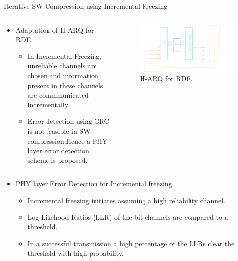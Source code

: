 \documentclass[final,hyperref={pdfpagelabels=false}]{beamer}
\begin{document}
\begin{frame}[t]
\begin{columns}[t]
\begin{column}{.465\textwidth}
\begin{block}{Iterative SW Compression using Incremental Freezing }
\begin{columns} %
\begin{column}{.5\textwidth}
\begin{itemize}
\item Adaptation of H-ARQ for RDE.
\begin{itemize}
\item In Incremental Freezing, unreliable channels are chosen and information present in these channels are commmunicated \cite{KC} incrementally.
\item Error detection using CRC is not feasible in SW compression.Hence a PHY layer error detection scheme is proposed.
\end{itemize}
\end{itemize}
\end{column}
\begin{column}{.5\textwidth}
\begin{figure}
\includegraphics[width=1.1\linewidth]{PHYHARQ.png}
\caption{H-ARQ for RDE.}
\end{figure}
\end{column}
\end{columns}
\begin{columns}
\begin{column}{.5\textwidth}
\begin{itemize}
\item PHY layer Error Detection for Incremental freezing.
\begin{itemize}
\item Incremental freezing initiates assuming a high reliability channel.
\item Log-Likehood Ratios (LLR) of the bit-channels are compared to a threshold.
\item In a successful transmission a high percentage of the LLRs clear the threshold with high probability.

\end{itemize}
\end{itemize}
\end{column}
\end{columns}
\end{block}
\end{column}
\end{columns}
\end{frame}
\end{document}
